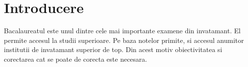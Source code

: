 \chapter{Introducere}
Bacalaureatul este unul dintre cele mai importante examene din invatamant. El permite accesul la studii superioare.
Pe baza notelor primite, si accesul anumitor institutii de invatamant superior de top. Din acest motiv obiectivitatea si corectarea cat se poate de corecta este necesara.
